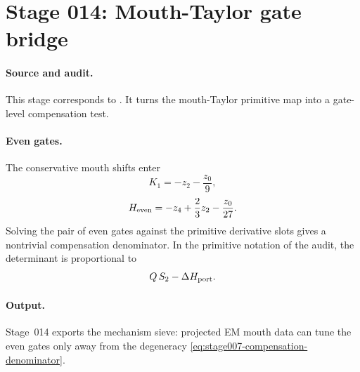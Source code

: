 \section[Stage 014]{Stage 014: Mouth-Taylor gate bridge}
\label{stage:014}


\paragraph{Source and audit.}
This stage corresponds to
.
It turns the mouth-Taylor primitive map into a gate-level compensation test.

\paragraph{Even gates.}
The conservative mouth shifts enter
\begin{equation}
\label{eq:stage014-k1}
K_1=-z_2-\frac{z_0}{9},
\end{equation}
\begin{equation}
\label{eq:stage014-heven}
H_{\rm even}=-z_4+\frac23z_2-\frac{z_0}{27}.
\end{equation}
Solving the pair of even gates against the primitive derivative slots gives a
nontrivial compensation denominator.  In the primitive notation of the audit,
the determinant is proportional to
\begin{equation}
\label{eq:stage007-compensation-denominator}
Q\,S_2-\Delta H_{\rm port}.
\end{equation}

\paragraph{Output.}
Stage~014 exports the mechanism sieve: projected EM mouth data can tune
the even gates only away from the degeneracy
\eqref{eq:stage007-compensation-denominator}.
